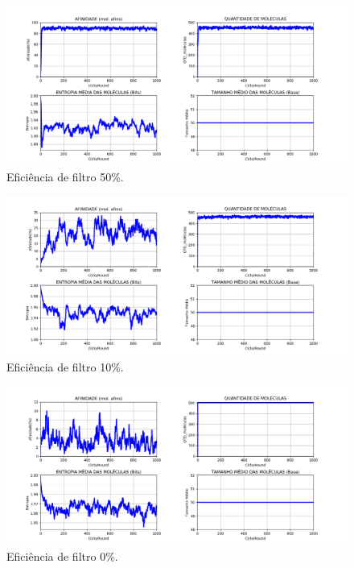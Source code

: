 \begin{figure}[!h]
    \centering
    \includegraphics[width=15cm]{figures/image7_alpha05_beta_50.png}
    \caption{Eficiência de filtro 50\%.}
    \label{fig:image7_alpha05_beta_50}
\end{figure}

\begin{figure}[!h]
    \centering
    \includegraphics[width=15cm]{figures/image6_alpha05_beta_10.png}
    \caption{Eficiência de filtro 10\%.}
    \label{fig:image6_alpha05_beta_10}
\end{figure}

\begin{figure}[!h]
    \centering
    \includegraphics[width=15cm]{figures/image5_alpha05_beta_00.png}
    \caption{Eficiência de filtro 0\%.}
    \label{fig:image5_alpha05_beta_0}
\end{figure}

